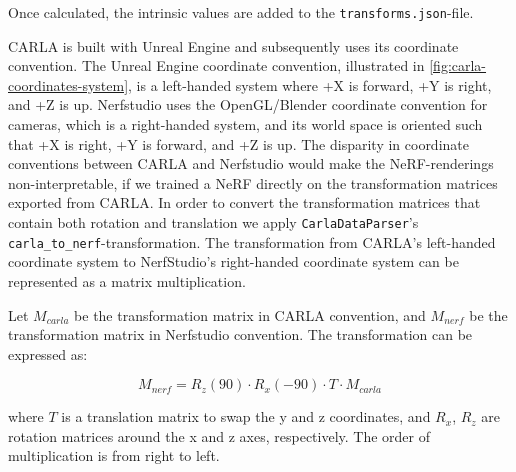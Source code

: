 Once calculated, the intrinsic values are added to the \texttt{transforms.json}-file.

CARLA is built with Unreal Engine and subsequently uses its coordinate convention. The Unreal Engine coordinate convention, illustrated in \autoref{fig:carla-coordinates-system}, is a left-handed system where +X is forward, +Y is right, and +Z is up. Nerfstudio uses the OpenGL/Blender coordinate convention for cameras, which is a right-handed system, and its world space is oriented such that +X is right, +Y is forward, and +Z is up. The disparity in coordinate conventions between CARLA and Nerfstudio would make the NeRF-renderings non-interpretable, if we trained a NeRF directly on the transformation matrices exported from CARLA. In order to convert the transformation matrices that contain both rotation and translation we apply \texttt{CarlaDataParser}'s \texttt{carla\_to\_nerf}-transformation. The transformation from CARLA's left-handed coordinate system to NerfStudio's right-handed coordinate system can be represented as a matrix multiplication.

Let $M_{carla}$ be the transformation matrix in CARLA convention, and $M_{nerf}$ be the transformation matrix in Nerfstudio convention. The transformation can be expressed as:

$$M_{nerf} = R_{z}(90) \cdot R_{x}(-90) \cdot T \cdot M_{carla} $$

where $T$ is a translation matrix to swap the y and z coordinates, and $R_{x}$, $R_{z}$ are rotation matrices around the x and z axes, respectively. The order of multiplication is from right to left.

\begin{comment}
    
as described in \textbf{INSERT FIGURE/EQUATION HERE}, before appending the frame to the \texttt{transforms.json}-file. The \texttt{carla\_to\_nerf} function takes a \texttt{carla.Transform} object as input and returns a 4x4 matrix in OpenGL/Blender-format. The function first extracts the location and rotation components of the input transform. The location component is then converted from the Unreal Engine coordinate system to the OpenGL/Blender coordinate system used by Nerfstudio. This conversion involves swapping the X and Y coordinates of the location and negating the Z coordinate. The rotation component is also converted to the OpenGL/Blender coordinate system by swapping the pitch and roll angles and adding 90 degrees to each angle. Finally, the transformed location and rotation components are combined into a new \texttt{carla.Transform} object, which is used to generate the 4x4 matrix that is returned by the function. An example of the transformed CARLA-matrix can be seen in \autoref{code:frame-example}.

\end{comment}
















